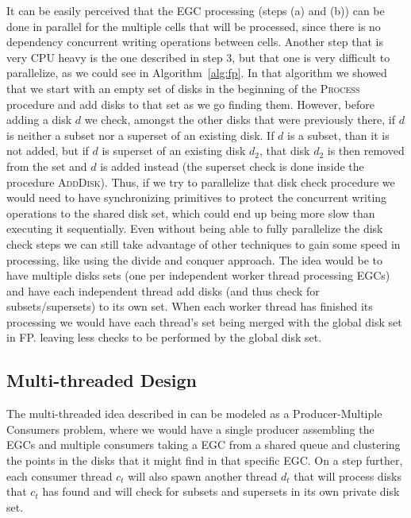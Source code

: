 It can be easily perceived that the EGC processing (steps (a) and (b)) can be done in parallel for the multiple cells
that will be processed, since there is no dependency concurrent writing operations between cells. Another step that is
very CPU heavy is the one described in step 3, but that one is very difficult to parallelize, as we could see in
Algorithm~\ref{alg:fp}. In that algorithm we showed that we start with an empty set of disks in the beginning of the
\textsc{Process} procedure and add disks to that set as we go finding them. However, before adding a disk $d$ we check,
amongst the other disks that were previously there, if $d$ is neither a subset nor a superset of an existing disk. If
$d$ is a subset, than it is not added, but if $d$ is superset of an existing disk $d_2$, that disk $d_2$ is then removed
from the set and $d$ is added instead (the superset check is done inside the procedure \textsc{AddDisk}). Thus, if we
try to parallelize that disk check procedure we would need to have synchronizing primitives to protect the concurrent
writing operations to the shared disk set, which could end up being more slow than executing it sequentially. Even
without being able to fully parallelize the disk check steps we can still take advantage of other techniques to gain
some speed in processing, like using the divide and conquer approach. The idea would be to have multiple disks sets (one
per independent worker thread processing EGCs) and have each independent thread add disks (and thus check for
subsets/supersets) to its own set. When each worker thread has finished its processing we would have each thread's set
being merged with the global disk set in FP. leaving less checks to be performed by the global disk set.

\subsection{Multi-threaded Design}
\label{subsec:multithread}
The multi-threaded idea described in  can be modeled as a Producer-Multiple Consumers problem,
where we would have a single producer assembling the EGCs and multiple consumers taking a EGC from a shared queue and
clustering the points in the disks that it might find in that specific EGC. On a step further, each consumer thread
$c_t$ will also spawn another thread $d_t$ that will process disks that $c_t$ has found and will check for subsets and
supersets in its own private disk set.

